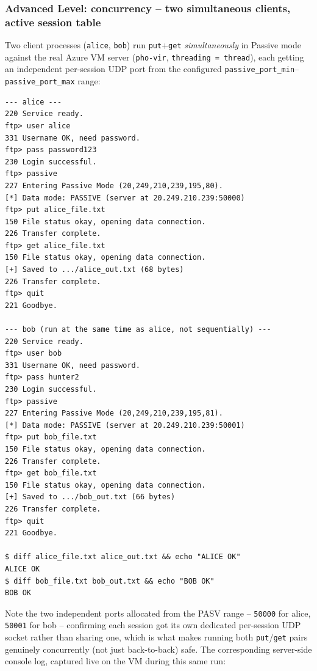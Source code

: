 \documentclass[11pt]{article}
\begin{document}
\subsubsection{Advanced Level: concurrency -- two simultaneous clients, active session table}
Two client processes (\texttt{alice}, \texttt{bob}) run \texttt{put}+\texttt{get}
\emph{simultaneously} in Passive mode against the real Azure VM server
(\texttt{pho-vir}, \texttt{threading = thread}), each getting an independent
per-session UDP port from the configured \texttt{passive\_port\_min}--\texttt{passive\_port\_max}
range:
\begin{lstlisting}
--- alice ---
220 Service ready.
ftp> user alice
331 Username OK, need password.
ftp> pass password123
230 Login successful.
ftp> passive
227 Entering Passive Mode (20,249,210,239,195,80).
[*] Data mode: PASSIVE (server at 20.249.210.239:50000)
ftp> put alice_file.txt
150 File status okay, opening data connection.
226 Transfer complete.
ftp> get alice_file.txt
150 File status okay, opening data connection.
[+] Saved to .../alice_out.txt (68 bytes)
226 Transfer complete.
ftp> quit
221 Goodbye.

--- bob (run at the same time as alice, not sequentially) ---
220 Service ready.
ftp> user bob
331 Username OK, need password.
ftp> pass hunter2
230 Login successful.
ftp> passive
227 Entering Passive Mode (20,249,210,239,195,81).
[*] Data mode: PASSIVE (server at 20.249.210.239:50001)
ftp> put bob_file.txt
150 File status okay, opening data connection.
226 Transfer complete.
ftp> get bob_file.txt
150 File status okay, opening data connection.
[+] Saved to .../bob_out.txt (66 bytes)
226 Transfer complete.
ftp> quit
221 Goodbye.

$ diff alice_file.txt alice_out.txt && echo "ALICE OK"
ALICE OK
$ diff bob_file.txt bob_out.txt && echo "BOB OK"
BOB OK
\end{lstlisting}
Note the two independent ports allocated from the PASV range -- \texttt{50000}
for alice, \texttt{50001} for bob -- confirming each session got its own
dedicated per-session UDP socket rather than sharing one, which is what makes
running both \texttt{put}/\texttt{get} pairs genuinely concurrently (not just
back-to-back) safe.
The corresponding server-side console log, captured live on the VM during this
same run:
\end{document}
